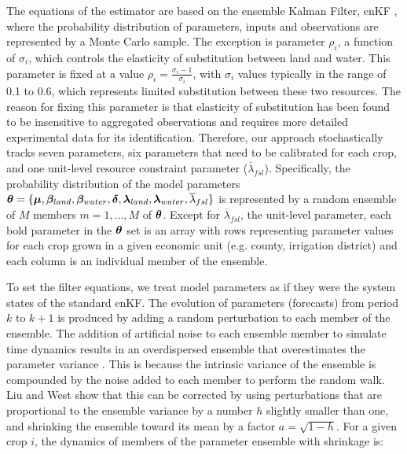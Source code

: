 The equations of the estimator are based on the ensemble Kalman Filter, enKF \citep{Evensen1994}, where the probability distribution of parameters, inputs and observations are represented by a Monte Carlo sample. The exception is parameter $\rho_i$, a function of $\sigma_i$, which controls the elasticity of substitution between land and water. This parameter is fixed at a value $\rho_i = \frac{\sigma_i - 1}{\sigma_i}$, with $\sigma_i$ values typically in the range of 0.1 to 0.6, which represents limited substitution between these two resources. The reason for fixing this parameter is that elasticity of substitution has been found to be insensitive to aggregated observations and requires more detailed experimental data for its identification. Therefore, our approach stochastically tracks seven parameters, six parameters that need to be calibrated for each crop, and one unit-level resource constraint parameter ($\overline{\lambda}_{fsl}$). Specifically, the probability distribution of the model parameters $\bm{\theta} = \{\bm{\mu},\allowbreak \bm{\beta}_{land},\allowbreak \bm{\beta}_{water}, \bm{\delta},\allowbreak \bm{\lambda}_{land},\allowbreak \bm{\lambda}_{water},\allowbreak \overline{\lambda}_{fsl}\}$ is represented by a random ensemble of $M$ members $m=1,...,M$ of $\bm{\theta}$. Except for $\overline{\lambda}_{fsl}$, the unit-level parameter, each bold parameter in the $\bm{\theta}$ set is an array with rows representing parameter values for each crop grown in a given economic unit (e.g. county, irrigation district) and each column is an individual member of the ensemble.

To set the filter equations, we treat model parameters as if they were the system states of the standard enKF. The evolution of parameters (forecasts) from period $k$ to $k+1$ is produced by adding a random perturbation to each member of the ensemble. The addition of artificial noise to each ensemble member to simulate time dynamics results in an overdispersed ensemble that overestimates the parameter variance \citep{West1993}. This is because the intrinsic variance of the ensemble is compounded by the noise added to each member to perform the random walk. Liu and West \citep{West1993} show that this can be corrected by using perturbations that are proportional to the ensemble variance by a number $h$ slightly smaller than one, and shrinking the ensemble toward its mean by a factor $a = \sqrt{1-h}$. For a given crop $i$,  the dynamics of members of the parameter ensemble with shrinkage is:   

